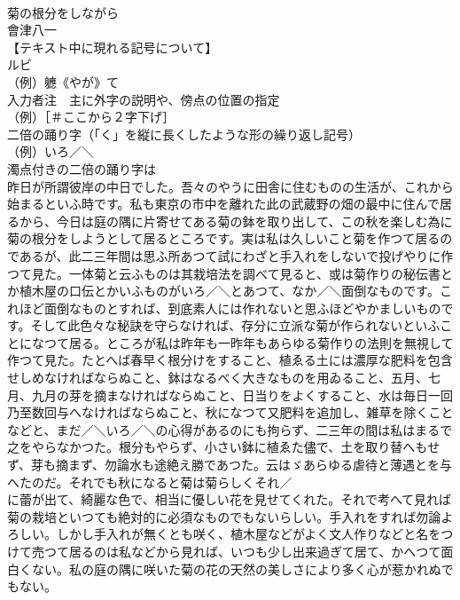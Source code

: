 \documentclass[8pt]{extreport}
\begin{document}
\begin{CJK}{UTF8}{min}
\\	菊の根分をしながら
\\	會津八一
\\	【テキスト中に現れる記号について】
\\	ルビ
\\	（例）軈《やが》て
\\	入力者注　主に外字の説明や、傍点の位置の指定
\\	（例）［＃ここから２字下げ］
\\	二倍の踊り字（「く」を縦に長くしたような形の繰り返し記号）
\\	（例）いろ／＼
\\	濁点付きの二倍の踊り字は
\\	昨日が所謂彼岸の中日でした。吾々のやうに田舎に住むものの生活が、これから始まるといふ時です。私も東京の市中を離れた此の武蔵野の畑の最中に住んで居るから、今日は庭の隅に片寄せてある菊の鉢を取り出して、この秋を楽しむ為に菊の根分をしようとして居るところです。実は私は久しいこと菊を作つて居るのであるが、此二三年間は思ふ所あつて試にわざと手入れをしないで投げやりに作つて見た。一体菊と云ふものは其栽培法を調べて見ると、或は菊作りの秘伝書とか植木屋の口伝とかいふものがいろ／＼とあつて、なか／＼面倒なものです。これほど面倒なものとすれば、到底素人には作れないと思ふほどやかましいものです。そして此色々な秘訣を守らなければ、存分に立派な菊が作られないといふことになつて居る。ところが私は昨年も一昨年もあらゆる菊作りの法則を無視して作つて見た。たとへば春早く根分けをすること、植ゑる土には濃厚な肥料を包含せしめなければならぬこと、鉢はなるべく大きなものを用ゐること、五月、七月、九月の芽を摘まなければならぬこと、日当りをよくすること、水は毎日一回乃至数回与へなければならぬこと、秋になつて又肥料を追加し、雑草を除くことなどと、まだ／＼いろ／＼の心得があるのにも拘らず、二三年の間は私はまるで之をやらなかつた。根分もやらず、小さい鉢に植ゑた儘で、土を取り替へもせず、芽も摘まず、勿論水も途絶え勝であつた。云はゞあらゆる虐待と薄遇とを与へたのだ。それでも秋になると菊は菊らしくそれ／
\\	に蕾が出て、綺麗な色で、相当に優しい花を見せてくれた。それで考へて見れば菊の栽培といつても絶対的に必須なものでもないらしい。手入れをすれば勿論よろしい。しかし手入れが無くとも咲く、植木屋などがよく文人作りなどと名をつけて売つて居るのは私などから見れば、いつも少し出来過ぎて居て、かへつて面白くない。私の庭の隅に咲いた菊の花の天然の美しさにより多く心が惹かれぬでもない。

\end{CJK}
\end{document}
